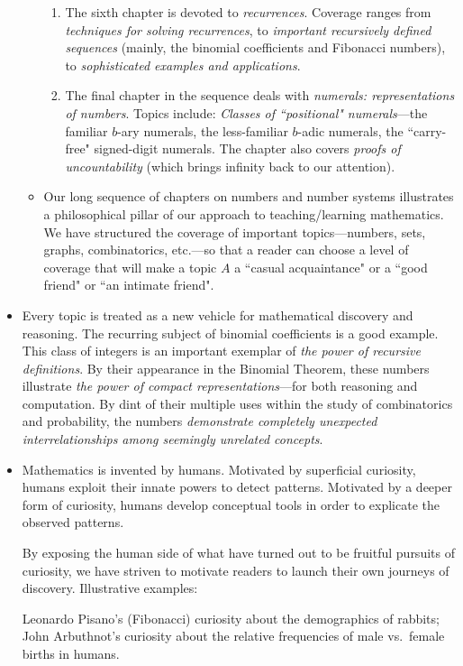 \documentclass{article}[12pt]
\begin{document}
\begin{itemize}
\begin{itemize}
\begin{enumerate}
  \item
The sixth chapter is devoted to {\em recurrences}.  Coverage ranges from {\em techniques for solving recurrences}, to {\em important recursively defined sequences} (mainly, the binomial coefficients and Fibonacci numbers), to {\em sophisticated examples and applications}.
  \item
The final chapter in the sequence deals with {\em numerals: representations of numbers}.  Topics include: {\em Classes of ``positional" numerals}---the familiar $b$-ary numerals, the less-familiar $b$-adic numerals, the ``carry-free" signed-digit numerals.  The chapter also covers {\em proofs of uncountability} (which brings infinity back to our attention).  
\end{enumerate}

\item
Our long sequence of chapters on numbers and number systems illustrates a philosophical pillar of our approach to teaching/learning mathematics.  We have structured the coverage of important topics---numbers, sets, graphs, combinatorics, etc.---so that a reader can choose a level of coverage that will make a topic $A$ a ``casual acquaintance" or a ``good friend" or ``an intimate friend".
\end{itemize}

\item
Every topic is treated as a new vehicle for mathematical discovery and reasoning.  The recurring subject of binomial coefficients is a good example.  This class of integers is an important exemplar of {\em the power of recursive definitions}.  By their appearance in the Binomial Theorem, these numbers illustrate {\em the power of compact representations}---for both reasoning and computation.  By dint of their multiple uses within the study of combinatorics and probability, the numbers {\em demonstrate completely unexpected interrelationships among seemingly unrelated concepts}.

\item
Mathematics is invented by humans.  Motivated by superficial curiosity, humans exploit their innate powers to detect patterns.  Motivated by a deeper form of curiosity, humans develop conceptual tools in order to explicate the observed patterns.

\smallskip

By exposing the human side of what have turned out to be fruitful pursuits of curiosity, we have striven to motivate readers to launch their own journeys of discovery.  Illustrative examples:

Leonardo Pisano's (Fibonacci) curiosity about the demographics of rabbits; John Arbuthnot's curiosity about the relative frequencies of male vs.~female births in humans. 
\end{itemize}
\end{document}
